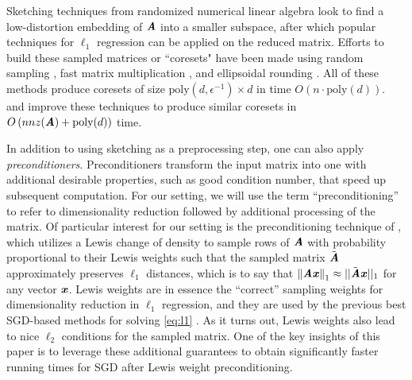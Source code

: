 Sketching techniques from randomized numerical linear algebra look to find a low-distortion embedding of $\AA$ into a smaller subspace, after which popular techniques for $\ell_1$ regression can be applied on the reduced matrix. Efforts to build these sampled matrices or ``coresets"
have been made using random sampling \citep{Clarkson05},
fast matrix multiplication \citep{SohlerW11},
and ellipsoidal rounding \citep{DasguptaDHKM09, ClarksonDMMMW13}.
All of these methods produce coresets of size 
$\text{poly}(d,\epsilon^{-1}) \times d$ in time $O(n \cdot \text{poly}(d))$.
\cite{MengM13embedding} and \cite{WoodruffZ13} improve these
techniques to produce similar coresets in $O \left( nnz(\AA)+\text{poly}(d) \right)$ time.


In addition to using sketching as a preprocessing step, one can also apply \emph{preconditioners}. Preconditioners transform the input matrix into one with additional desirable properties, such as good condition number, that speed up subsequent computation. For our setting, we will use the term ``preconditioning'' to refer to dimensionality reduction followed by additional processing of the matrix. Of particular interest for our setting is the preconditioning technique of \cite{cohenpeng}, which utilizes a Lewis change of density \citep{Lewis78} to sample rows of $\AA$ with probability proportional to their Lewis weights such that the sampled matrix $\tilde{\AA}$ approximately preserves $\ell_1$ distances, which is to say that $\norm{\AA \xx}_1 \approx ||\tilde{\AA}\xx||_1$ for any vector $\xx$. Lewis weights are in essence the ``correct'' sampling weights for dimensionality reduction in $\ell_1$ regression, and they are used by the previous best SGD-based methods for solving \cref{eq:l1} \citep{YangCRM16}. As it turns out, Lewis weights also lead to nice $\ell_2$ conditions for the sampled matrix. One of the key insights of this paper is to leverage these additional guarantees to obtain significantly faster running times for SGD after Lewis weight preconditioning.

